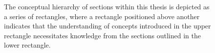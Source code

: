 \documentclass[openany, a4paper, 10pt]{book}
\theoremstyle{plain}
\theoremstyle{plain}
\theoremstyle{plain}
\theoremstyle{definition}
\theoremstyle{plain}
\theoremstyle{definition}
\theoremstyle{remark}
\begin{document}
\begin{figure}[ht]
\begin{center}
    \end{center}
    \vspace{-1em}
    \caption{The conceptual hierarchy of sections within this thesis is depicted as a series of rectangles, where a rectangle positioned above another indicates that the understanding of concepts introduced in the upper rectangle necessitates knowledge from the sections outlined in the lower rectangle.}
    \label{hierarchy}
\end{figure}

{
    \hypersetup{linkcolor=black}
    \tableofcontents
}


\setcounter{chapter}{-1}
\end{document}
